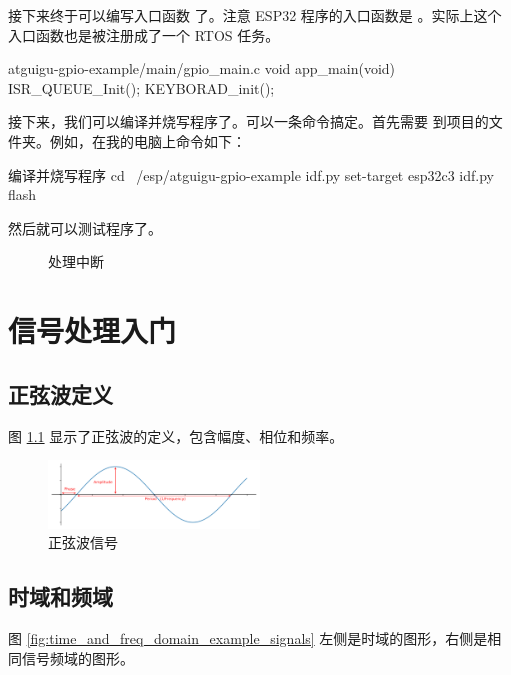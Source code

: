 \documentclass[lang=cn,newtx,10pt,scheme=chinese]{elegantbook}
\begin{document}
接下来终于可以编写入口函数  了。注意 ESP32 程序的入口函数是  。实际上这个入口函数也是被注册成了一个 RTOS 任务。

\begin{mycode}{atguigu-gpio-example/main/gpio\_main.c}
void app_main(void)
{
    ISR_QUEUE_Init();
    KEYBORAD_init();
}
\end{mycode}

接下来，我们可以编译并烧写程序了。可以一条命令搞定。首先需要  到项目的文件夹。例如，在我的电脑上命令如下：

\begin{mycode}{编译并烧写程序}
cd ~/esp/atguigu-gpio-example
idf.py set-target esp32c3
idf.py flash
\end{mycode}

然后就可以测试程序了。

\begin{figure}[!htb]
    \centering
    \caption{处理中断}
\end{figure}

\chapter{信号处理入门}

\section{正弦波定义}

图 \ref{fig:amplitude_phase_period} 显示了正弦波的定义，包含幅度、相位和频率。

\begin{figure}[!htb]
\centering
\includegraphics[width=0.5\textwidth]{amplitude_phase_period.pdf}
\caption{正弦波信号}
\label{fig:amplitude_phase_period}
\end{figure}

\section{时域和频域}

图 \ref{fig:time_and_freq_domain_example_signals} 左侧是时域的图形，右侧是相同信号频域的图形。
\end{document}
